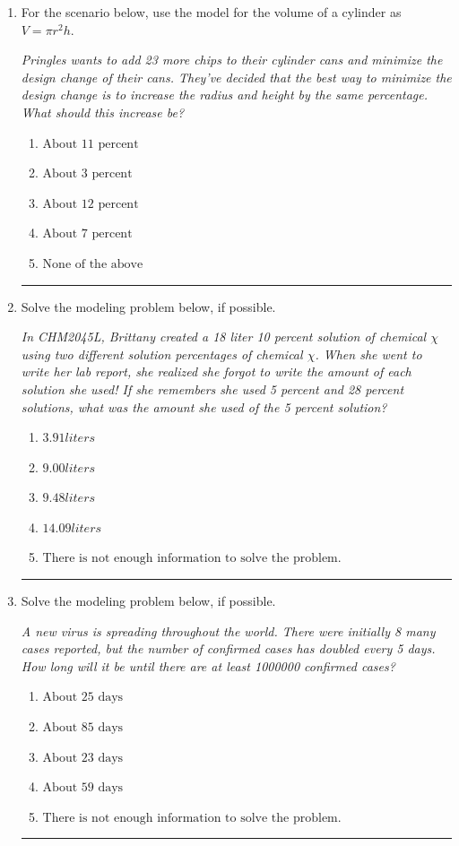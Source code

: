 \documentclass[14pt]{extbook}
\newcommand{\litem}[1]{\item#1\hspace*{-1cm}\rule{\textwidth}{0.4pt}}
\begin{document}
\begin{enumerate}
\litem{
For the scenario below, use the model for the volume of a cylinder as $V = \pi r^2 h$.
\begin{center}
    \textit{ Pringles wants to add 23 \text{percent} more chips to their cylinder cans and minimize the design change of their cans. They've decided that the best way to minimize the design change is to increase the radius and height by the same percentage. What should this increase be? }
\end{center}
\begin{enumerate}[label=\Alph*.]
\item \( \text{About } 11 \text{ percent} \)
\item \( \text{About } 3 \text{ percent} \)
\item \( \text{About } 12 \text{ percent} \)
\item \( \text{About } 7 \text{ percent} \)
\item \( \text{None of the above} \)

\end{enumerate} }
\litem{
Solve the modeling problem below, if possible.
\begin{center}
    \textit{ In CHM2045L, Brittany created a 18 liter 10 percent solution of chemical $\chi$ using two different solution percentages of chemical $\chi$. When she went to write her lab report, she realized she forgot to write the amount of each solution she used! If she remembers she used 5 percent and 28 percent solutions, what was the amount she used of the 5 percent solution? }
\end{center}
\begin{enumerate}[label=\Alph*.]
\item \( 3.91 liters \)
\item \( 9.00 liters \)
\item \( 9.48 liters \)
\item \( 14.09 liters \)
\item \( \text{There is not enough information to solve the problem.} \)

\end{enumerate} }
\litem{
Solve the modeling problem below, if possible.
\begin{center}
    \textit{ A new virus is spreading throughout the world. There were initially 8 many cases reported, but the number of confirmed cases has doubled every 5 days. How long will it be until there are at least 1000000 confirmed cases? }
\end{center}
\begin{enumerate}[label=\Alph*.]
\item \( \text{About } 25 \text{ days} \)
\item \( \text{About } 85 \text{ days} \)
\item \( \text{About } 23 \text{ days} \)
\item \( \text{About } 59 \text{ days} \)
\item \( \text{There is not enough information to solve the problem.} \)


\end{enumerate}}
\end{enumerate}
\end{document}

